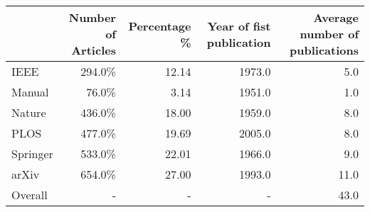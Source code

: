 \begin{tabular}{lrrrr}
\toprule
{} &  Number of Articles &  Percentage \% &  Year of fist publication &  Average number of publications\\
\midrule
IEEE     &               294.0\%&       12.14 &                    1973.0 &                             5.0\\
Manual   &                76.0\%&        3.14 &                    1951.0 &                             1.0\\
Nature   &               436.0\%&       18.00 &                    1959.0 &                             8.0\\
PLOS     &               477.0\%&       19.69 &                    2005.0 &                             8.0\\
Springer &               533.0\%&       22.01 &                    1966.0 &                             9.0\\
arXiv    &               654.0\%&       27.00 &                    1993.0 &                            11.0\\
Overall  &                   -&           - &                         - &                            43.0\\
\bottomrule
\end{tabular}
